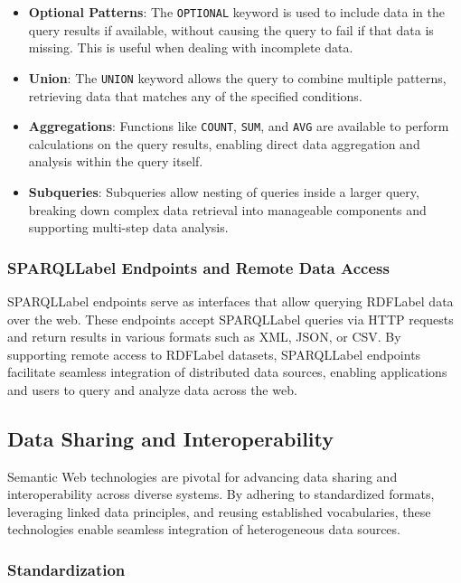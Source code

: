 \begin{itemize}
    \item \textbf{Optional Patterns}: The \texttt{OPTIONAL} keyword is used to include data in the query results if available, without causing the query to fail if that data is missing. This is useful when dealing with incomplete data.
    \item \textbf{Union}: The \texttt{UNION} keyword allows the query to combine multiple patterns, retrieving data that matches any of the specified conditions.
    \item \textbf{Aggregations}: Functions like \texttt{COUNT}, \texttt{SUM}, and \texttt{AVG} are available to perform calculations on the query results, enabling direct data aggregation and analysis within the query itself.
    \item \textbf{Subqueries}: Subqueries allow nesting of queries inside a larger query, breaking down complex data retrieval into manageable components and supporting multi-step data analysis.
\end{itemize}

\subsubsection{\acrshort{SPARQLLabel} Endpoints and Remote Data Access}\label{II-subsubsec:SPARQL}

\acrshort{SPARQLLabel} endpoints serve as interfaces that allow querying \acrshort{RDFLabel} data over the web. These endpoints accept \acrshort{SPARQLLabel} queries via HTTP requests and return results in various formats such as XML, JSON, or CSV. By supporting remote access to \acrshort{RDFLabel} datasets, \acrshort{SPARQLLabel} endpoints facilitate seamless integration of distributed data sources, enabling applications and users to query and analyze data across the web.


\subsection{Data Sharing and Interoperability}\label{II-subsec:data_sharing}

Semantic Web technologies are pivotal for advancing data sharing and interoperability across diverse systems. By adhering to standardized formats, leveraging linked data principles, and reusing established vocabularies, these technologies enable seamless integration of heterogeneous data sources.

\subsubsection{Standardization}\label{II-subsubsec:standardization}

